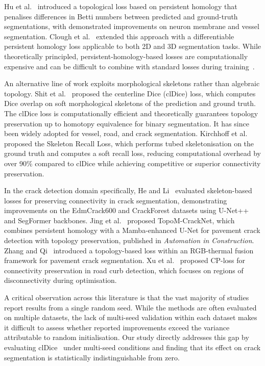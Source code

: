 \documentclass[preprint,12pt]{elsarticle}
\begin{document}
Hu et al.~\cite{hu2019topology} introduced a topological loss based on persistent homology that penalises differences in Betti numbers between predicted and ground-truth segmentations, with demonstrated improvements on neuron membrane and vessel segmentation. Clough et al.~\cite{clough2020topological} extended this approach with a differentiable persistent homology loss applicable to both 2D and 3D segmentation tasks. While theoretically principled, persistent-homology-based losses are computationally expensive and can be difficult to combine with standard losses during training~\cite{hu2021topology}.

An alternative line of work exploits morphological skeletons rather than algebraic topology. Shit et al.~\cite{shit2021cldice} proposed the centerline Dice (clDice) loss, which computes Dice overlap on soft morphological skeletons of the prediction and ground truth. The clDice loss is computationally efficient and theoretically guarantees topology preservation up to homotopy equivalence for binary segmentation. It has since been widely adopted for vessel, road, and crack segmentation. Kirchhoff et al.~\cite{kirchhoff2024skeleton} proposed the Skeleton Recall Loss, which performs tubed skeletonisation on the ground truth and computes a soft recall loss, reducing computational overhead by over 90\% compared to clDice while achieving competitive or superior connectivity preservation.

In the crack detection domain specifically, He and Li~\cite{he2024beyond} evaluated skeleton-based losses for preserving connectivity in crack segmentation, demonstrating improvements on the EdmCrack600 and CrackForest datasets using U-Net++ and SegFormer backbones. Jing et al.~\cite{jing2025topology} proposed TopoM-CrackNet, which combines persistent homology with a Mamba-enhanced U-Net for pavement crack detection with topology preservation, published in \textit{Automation in Construction}. Zhang and Qi~\cite{zhang2024irfusionformer} introduced a topology-based loss within an RGB-thermal fusion framework for pavement crack segmentation. Xu et al.~\cite{xu2021cploss} proposed CP-loss for connectivity preservation in road curb detection, which focuses on regions of disconnectivity during optimisation.

A critical observation across this literature is that the vast majority of studies report results from a single random seed. While the methods are often evaluated on multiple datasets, the lack of multi-seed validation within each dataset makes it difficult to assess whether reported improvements exceed the variance attributable to random initialisation. Our study directly addresses this gap by evaluating clDice~\cite{shit2021cldice} under multi-seed conditions and finding that its effect on crack segmentation is statistically indistinguishable from zero.
\end{document}
